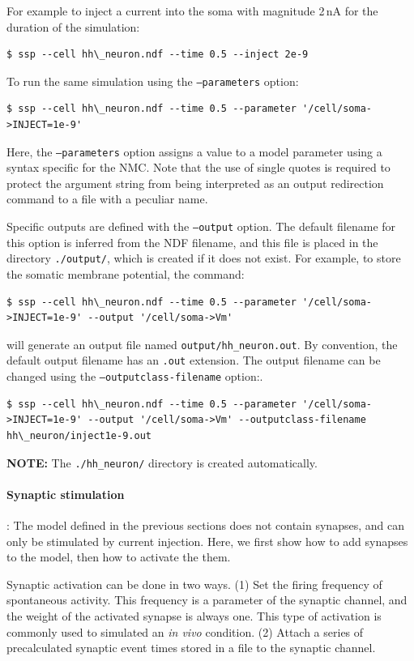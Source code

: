 \documentclass[12pt]{article}
\begin{document}
For example to inject a current into the soma with magnitude 2$\,$nA
for the duration of the simulation:

\begin{verbatim}
$ ssp --cell hh\_neuron.ndf --time 0.5 --inject 2e-9
\end{verbatim}

To run the same simulation using the {\tt --parameters} option:

\begin{verbatim}
$ ssp --cell hh\_neuron.ndf --time 0.5 --parameter '/cell/soma->INJECT=1e-9'
\end{verbatim}

Here, the {\tt --parameters} option assigns a value to a model
parameter using a syntax specific for the NMC.  Note that the use of
single quotes is required to protect the argument string from being
interpreted as an output redirection command to a file with a peculiar
name.

Specific outputs are defined with the {\tt --output} option.  The
default filename for this option is inferred from the NDF filename,
and this file is placed in the directory {\tt ./output/}, which is
created if it does not exist.  For example, to store the somatic
membrane potential, the command:
\begin{verbatim}
$ ssp --cell hh\_neuron.ndf --time 0.5 --parameter '/cell/soma->INJECT=1e-9' --output '/cell/soma->Vm'
\end{verbatim}
will generate an output file named {\tt output/hh\_neuron.out}.  By
convention, the default output filename has an {\tt .out} extension.
The output filename can be changed using the {\tt --outputclass-filename} option:.
\begin{verbatim}
$ ssp --cell hh\_neuron.ndf --time 0.5 --parameter '/cell/soma->INJECT=1e-9' --output '/cell/soma->Vm' --outputclass-filename hh\_neuron/inject1e-9.out
\end{verbatim}
{\bf NOTE:} The {\tt ./hh\_neuron/} directory is created automatically.

\paragraph{Synaptic stimulation}: The model defined in the previous sections does not contain synapses,
and can only be stimulated by current injection.  Here, we first show
how to add synapses to the model, then how to activate the them.

Synaptic activation can be done in two ways. (1) Set the firing frequency of spontaneous activity.
This frequency is a parameter of the synaptic channel, and the weight
of the activated synapse is always one.  This type of activation is
commonly used to simulated an {\it in vivo} condition. (2) Attach a series of
precalculated synaptic event times stored in a file to the synaptic
channel.
\end{document}
